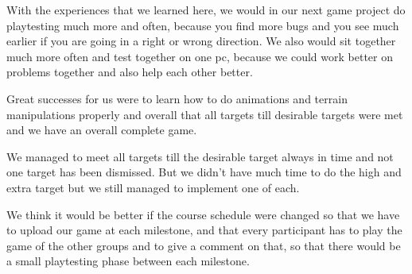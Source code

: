 \documentclass[12pt, letterpaper]{scrartcl}
\begin{document}
	With the experiences that we learned here, we would in our next game project do playtesting much more and often, because you find more bugs and you see much earlier if you are going in a right or wrong direction. We also would sit together much more often and test together on one pc, because we could work better on problems together and also help each other better.
	
	Great successes for us were to learn how to do animations and terrain manipulations properly and overall that all targets till desirable targets were met and we have an overall complete game.
	
	We managed to meet all targets till the desirable target always in time and not one target has been dismissed. But we didn't have much time to do the high and extra target but we still managed to implement one of each.
	
	We think it would be better if the course schedule were changed so that we have to upload our game at each milestone, and that every participant has to play the game of the other groups and to give a comment on that, so that there would be a small playtesting phase between each milestone.
	 
\end{document}
